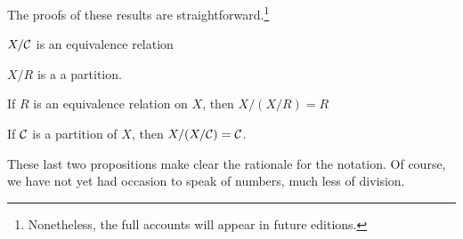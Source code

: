 
The proofs of these results are straightforward.\footnote{Nonetheless, the full accounts will appear in future editions.}

\begin{proposition}
  $X/\mathcal{C}$ is an equivalence relation
\end{proposition}
\begin{proposition}
  $X/R$ is a a partition.
\end{proposition}

\begin{proposition}
  If $R$ is an equivalence relation on $X$, then $X/(X/R) = R$
\end{proposition}

\begin{proposition}
  If $\mathcal{C}$ is a partition of $X$, then $X/(X/\mathcal{C}) = \mathcal{C}$.
\end{proposition}

These last two propositions make clear the rationale for the notation.
Of course, we have not yet had occasion to speak of numbers, much less of division.



%
%
%
%
%
%
%
%
